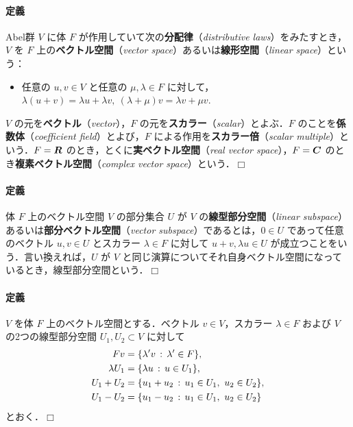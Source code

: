 \documentclass[pandoc,base=10pt,b5j,precisetext]{bxjsarticle}
\providecommand{\tightlist}{%
  \setlength{\itemsep}{0pt}\setlength{\parskip}{0pt}}
\let\oldparagraph\paragraph
\renewcommand{\paragraph}[1]{\oldparagraph{#1}\mbox{}}
\begin{document}
\hypertarget{vector-space-def}{%
\paragraph{定義}\label{vector-space-def}}

Abel群 \(V\) に体 \(F\)
が作用していて次の\textbf{分配律}（\emph{distributive
laws}）をみたすとき，\(V\) を \(F\)
上の\textbf{ベクトル空間}（\emph{vector
space}）あるいは\textbf{線形空間}（\emph{linear space}）という：

\begin{itemize}
\tightlist
\item
  任意の \(u, v \in V\) と任意の \(\mu, \lambda \in F\)
  に対して，\(\lambda (u + v) = \lambda u + \lambda v,\ (\lambda + \mu) v = \lambda v + \mu v\).
\end{itemize}

\(V\) の元を\textbf{ベクトル}（\emph{vector}），\(F\)
の元を\textbf{スカラー}（\emph{scalar}）とよぶ．\(F\)
のことを\textbf{係数体}（\emph{coefficient field}）とよび，\(F\)
による作用を\textbf{スカラー倍}（\emph{scalar
multiple}）という．\(F = \boldsymbol{R}\)
のとき，とくに\textbf{実ベクトル空間}（\emph{real vector
space}），\(F = \boldsymbol{C}\) のとき\textbf{複素ベクトル空間}（\emph{complex
vector space}）という．\(\Box\)

\hypertarget{linear-subspace}{%
\paragraph{定義}\label{linear-subspace}}

体 \(F\) 上のベクトル空間 \(V\) の部分集合 \(U\) が \(V\)
の\textbf{線型部分空間}（\emph{linear
subspace}）あるいは\textbf{部分ベクトル空間}（\emph{vector
subspace}）であるとは，\(0 \in U\) であって任意のベクトル \(u, v \in U\)
とスカラー \(\lambda \in F\) に対して \(u + v, \lambda u \in U\)
が成立つことをいう．言い換えれば，\(U\) が \(V\)
と同じ演算についてそれ自身ベクトル空間になっているとき，線型部分空間という．\(\Box\)

\hypertarget{operation-of-spaces}{%
\paragraph{定義}\label{operation-of-spaces}}

\(V\) を体 \(F\) 上のベクトル空間とする．ベクトル \(v \in V\)，スカラー
\(\lambda \in F\) および \(V\) の2つの線型部分空間
\(U_1, U_2 \subset V\) に対して \begin{align*}
Fv &= \{ \lambda' v \,:\, \lambda' \in F \},\\
\lambda U_1 &= \{ \lambda u \,:\, u \in U_1 \},\\
U_1 + U_2 &= \{ u_1 + u_2 \,:\, u_1 \in U_1,\ u_2 \in U_2 \},\\
U_1 - U_2 &= \{ u_1 - u_2 \,:\, u_1 \in U_1,\ u_2 \in U_2 \}
\end{align*} とおく．\(\Box\)
\end{document}
